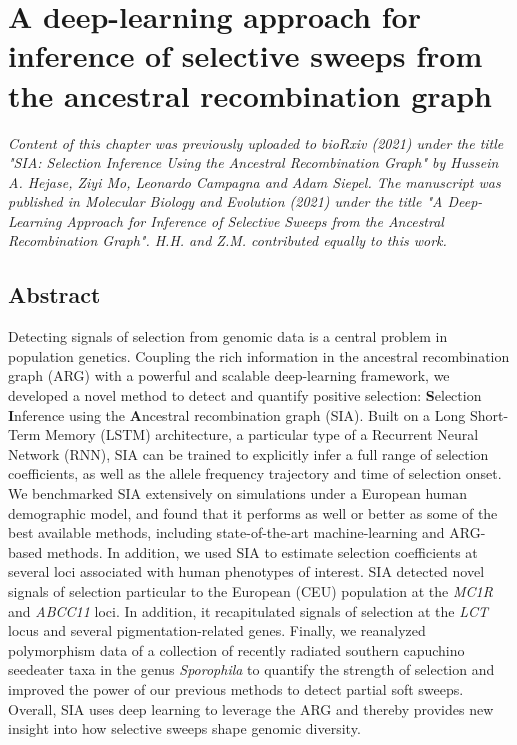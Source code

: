 \chapter{A deep-learning approach for inference of selective sweeps from the ancestral recombination graph}

\textit{Content of this chapter was previously uploaded to bioRxiv (2021) under the title "SIA: Selection Inference Using the Ancestral Recombination Graph" by Hussein A. Hejase, Ziyi Mo, Leonardo Campagna and Adam Siepel. The manuscript was published in Molecular Biology and Evolution (2021) under the title "A Deep-Learning Approach for Inference of Selective Sweeps from the Ancestral Recombination Graph". H.H. and Z.M. contributed equally to this work.}

\section{Abstract}

Detecting signals of selection from genomic data is a central problem in population genetics. Coupling the rich information in the ancestral recombination graph (ARG) with a powerful and scalable deep-learning framework, we developed a novel method to detect and quantify positive selection: \textbf{S}election \textbf{I}nference using the \textbf{A}ncestral recombination graph (SIA). Built on a Long Short-Term Memory (LSTM) architecture, a particular type of a Recurrent Neural Network (RNN), SIA can be trained to explicitly infer a full range of selection coefficients, as well as the allele frequency trajectory and time of selection onset. We benchmarked SIA extensively on simulations under a European human demographic model, and found that it performs as well or better as some of the best available methods, including state-of-the-art machine-learning and ARG-based methods. In addition, we used SIA to estimate selection coefficients at several loci associated with human phenotypes of interest. SIA detected novel signals of selection particular to the European (CEU) population at the \textit{MC1R} and \textit{ABCC11} loci. In addition, it recapitulated signals of selection at the \textit{LCT} locus and several pigmentation-related genes. Finally, we reanalyzed polymorphism data of a collection of recently radiated southern capuchino seedeater taxa in the genus \textit{Sporophila} to quantify the strength of selection and improved the power of our previous methods to detect partial soft sweeps. Overall, SIA uses deep learning to leverage the ARG and thereby provides new insight into how selective sweeps shape genomic diversity.

